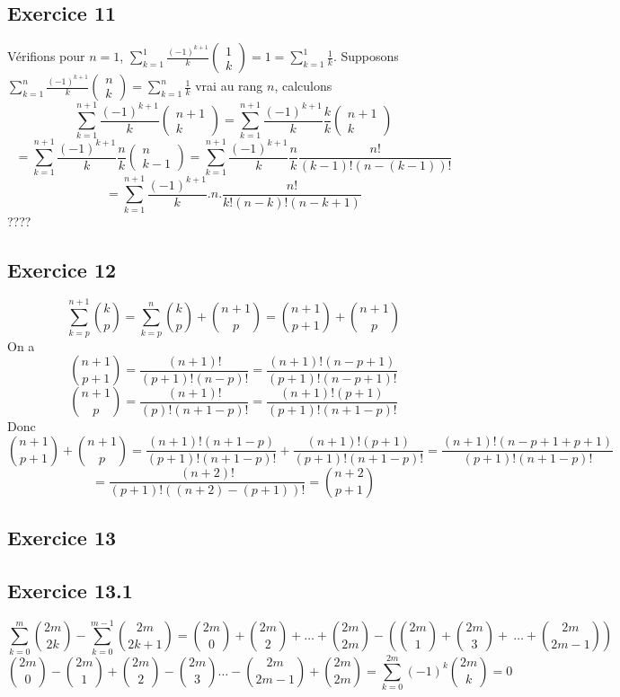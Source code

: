 \documentclass[]{book}
\theoremstyle{definition}
\begin{document}
\subsection*{Exercice 11}
V\'erifions pour $n=1$, $\sum_{k=1}^{1}\frac{(-1)^{k+1}}{k}\begin{pmatrix}1\\k\end{pmatrix} = 1 = \sum_{k=1}^{1} \frac{1}{k}$. Supposons $\sum_{k=1}^{n}\frac{(-1)^{k+1}}{k}\begin{pmatrix}n\\k\end{pmatrix} = \sum_{k=1}^{n}\frac{1}{k}$ vrai au rang $n$, calculons
$$\sum_{k=1}^{n+1}\frac{(-1)^{k+1}}{k}\begin{pmatrix}n+1\\k\end{pmatrix} = \sum_{k=1}^{n+1}\frac{(-1)^{k+1}}{k}\frac{k}{k}\begin{pmatrix}n+1\\k\end{pmatrix}$$
$$= \sum_{k=1}^{n+1}\frac{(-1)^{k+1}}{k}\frac{n}{k}\begin{pmatrix}n\\k-1\end{pmatrix} = \sum_{k=1}^{n+1}\frac{(-1)^{k+1}}{k}\frac{n}{k}\frac{n!}{(k-1)!(n-(k-1))!}$$
$$= \sum_{k=1}^{n+1}\frac{(-1)^{k+1}}{k}.n.\frac{n!}{k!(n-k)!(n-k+1)}$$
????

\subsection*{Exercice 12}
$$\sum_{k=p}^{n+1}\binom{k}{p} = \sum_{k=p}^{n}\binom{k}{p} + \binom{n+1}{p} = \binom{n+1}{p+1} + \binom{n+1}{p}$$
On a 
$$\binom{n+1}{p+1} = \frac{(n+1)!}{(p+1)!(n-p)!} = \frac{(n+1)!(n-p+1)}{(p+1)!(n-p+1)!}$$
$$\binom{n+1}{p} = \frac{(n+1)!}{(p)!(n+1-p)!} = \frac{(n+1)!(p+1)}{(p+1)!(n+1-p)!}$$
Donc
$$\binom{n+1}{p+1} + \binom{n+1}{p} = \frac{(n+1)!(n+1-p)}{(p+1)!(n+1-p)!} + \frac{(n+1)!(p+1)}{(p+1)!(n+1-p)!} = \frac{(n+1)!(n-p+1+p+1)}{(p+1)!(n+1-p)!}$$
$$= \frac{(n+2)!}{(p+1)!((n+2)-(p+1))!} = \binom{n+2}{p+1}$$
 
\subsection*{Exercice 13}
\subsection*{Exercice 13.1}$$\sum_{k=0}^{m}\binom{2m}{2k} - \sum_{k=0}^{m-1}\binom{2m}{2k+1} = \binom{2m}{0} + \binom{2m}{2} + \ldots + \binom{2m}{2m} - (\binom{2m}{1} + \binom{2m}{3} + \ \ldots + \binom{2m}{2m-1}) $$
$$\binom{2m}{0} - \binom{2m}{1} + \binom{2m}{2} - \binom{2m}{3} \ldots -\binom{2m}{2m-1} + \binom{2m}{2m}=  \sum_{k=0}^{2m} (-1)^k\binom{2m}{k} = 0$$
\end{document}
